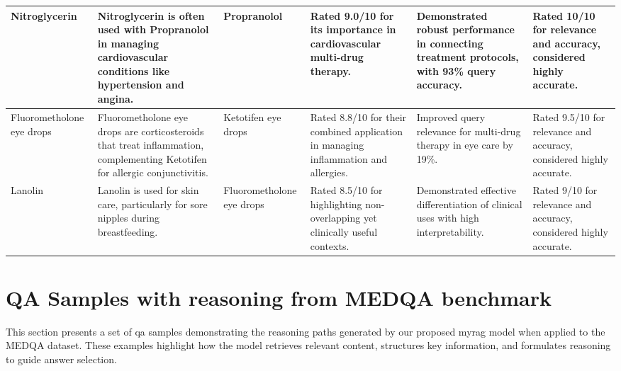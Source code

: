 \begin{table*}[ht]
{\begin{tabular}{|p{2cm}|p{3cm}|p{2cm}|p{3cm}|p{3cm}|p{3cm}|}
Nitroglycerin & Nitroglycerin is often used with Propranolol in managing cardiovascular conditions like hypertension and angina. & Propranolol & Rated 9.0/10 for its importance in cardiovascular multi-drug therapy. & Demonstrated robust performance in connecting treatment protocols, with 93\% query accuracy. &Rated 10/10 for relevance and accuracy, considered highly accurate. \\ \hline
Fluorometholone eye drops & Fluorometholone eye drops are corticosteroids that treat inflammation, complementing Ketotifen for allergic conjunctivitis. & Ketotifen eye drops & Rated 8.8/10 for their combined application in managing inflammation and allergies. & Improved query relevance for multi-drug therapy in eye care by 19\%. &Rated 9.5/10 for relevance and accuracy, considered highly accurate.\\ \hline
Lanolin & Lanolin is used for skin care, particularly for sore nipples during breastfeeding. & Fluorometholone eye drops & Rated 8.5/10 for highlighting non-overlapping yet clinically useful contexts. & Demonstrated effective differentiation of clinical uses with high interpretability. &Rated 9/10 for relevance and accuracy, considered highly accurate.\\ \hline
\end{tabular}}
\end{table*}

\section{QA Samples with reasoning from MEDQA benchmark}
This section presents a set of \gls{qa} samples demonstrating the reasoning paths generated by our proposed \gls{myrag} model when applied to the MEDQA dataset. These examples highlight how the model retrieves relevant content, structures key information, and formulates reasoning to guide answer selection.

